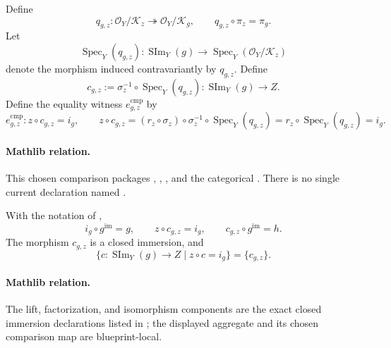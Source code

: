 \begin{definition}
\[  \]
  Define
  \[
    q_{g,z}\colon\mathcal O_Y/\mathcal K_z
      \twoheadrightarrow\mathcal O_Y/\mathcal K_g,
    \qquad
    q_{g,z}\circ\pi_z=\pi_g.
  \]
  Let
  \[
    \operatorname{Spec}_Y(q_{g,z})\colon
      \operatorname{SIm}_Y(g)\longrightarrow
      \operatorname{Spec}_Y(\mathcal O_Y/\mathcal K_z)
  \]
  denote the morphism induced contravariantly by $q_{g,z}$.  Define
  \[
    c_{g,z}:=\sigma_z^{-1}\circ\operatorname{Spec}_Y(q_{g,z})
      \colon\operatorname{SIm}_Y(g)\longrightarrow Z.
  \]
  Define the equality witness $e_{g,z}^{\mathrm{cmp}}$ by
  \[
    e_{g,z}^{\mathrm{cmp}}\colon z\circ c_{g,z}=i_g,
    \qquad
    z\circ c_{g,z}
      =(r_z\circ\sigma_z)\circ\sigma_z^{-1}
        \circ\operatorname{Spec}_Y(q_{g,z})
      =r_z\circ\operatorname{Spec}_Y(q_{g,z})
      =i_g.
  \]

  \paragraph{Mathlib relation.}
  This chosen comparison packages
  \texttt{},
  \texttt{},
  \texttt{}, and the categorical
  \texttt{}.  There is no single current
  declaration named
  \texttt{}.
\end{definition}

\begin{lemma}
  \label{lemma:nagata-scheme-image-universal}
  \lean{}

  With the notation of
  ,
  \[
    i_g\circ g^{\mathrm{im}}=g,
    \qquad z\circ c_{g,z}=i_g,
    \qquad c_{g,z}\circ g^{\mathrm{im}}=h.
  \]
  The morphism $c_{g,z}$ is a closed immersion, and
  \[
    \{c\colon\operatorname{SIm}_Y(g)\to Z\mid z\circ c=i_g\}
      =\{c_{g,z}\}.
  \]

  \paragraph{Mathlib relation.}
  The lift, factorization, and isomorphism components are the exact closed
  immersion declarations listed in
  ; the displayed aggregate and its
  chosen comparison map are blueprint-local.
\end{lemma}

